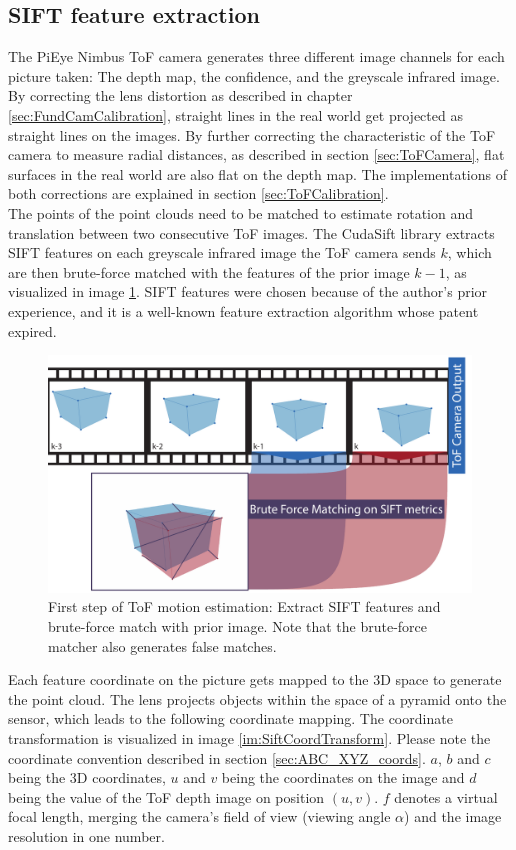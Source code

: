 \subsection{SIFT feature extraction}
\label{sec:ToFPosition_SIFT}
The PiEye Nimbus ToF camera generates three different image channels for each picture taken: The depth map, the confidence, and the greyscale infrared image. By correcting the lens distortion as described in chapter \ref{sec:FundCamCalibration}, straight lines in the real world get projected as straight lines on the images. By further correcting the characteristic of the ToF camera to measure radial distances, as described in section \ref{sec:ToFCamera}, flat surfaces in the real world are also flat on the depth map. The implementations of both corrections are explained in section \ref{sec:ToFCalibration}. \\
The points of the point clouds need to be matched to estimate rotation and translation between two consecutive ToF images. The CudaSift library\cite{cudaSiftRepo}\cite{CudaSiftPublication} extracts SIFT\cite{siftpaper} features on each greyscale infrared image the ToF camera sends $k$, which are then brute-force matched with the features of the prior image $k-1$, as visualized in image \ref{im:SiftExtraction}. SIFT features were chosen because of the author's prior experience, and it is a well-known feature extraction algorithm whose patent expired.\cite{siftpatent}
\begin{figure}[H]
    \centering
    \includegraphics[width=1.0\textwidth]{images/feature_matching_bruteforce.pdf}
    \caption{First step of ToF motion estimation: Extract SIFT features and brute-force match with prior image. Note that the brute-force matcher also generates false matches.}
    \label{im:SiftExtraction}
\end{figure}
Each feature coordinate on the picture gets mapped to the 3D space to generate the point cloud. The lens projects objects within the space of a pyramid onto the sensor, which leads to the following coordinate mapping. The coordinate transformation is visualized in image \ref{im:SiftCoordTransform}. Please note the coordinate convention described in section \ref{sec:ABC_XYZ_coords}. $a$, $b$ and $c$ being the 3D coordinates, $u$ and $v$ being the coordinates on the image and $d$ being the value of the ToF depth image on position $(u,v)$. $f$ denotes a virtual focal length, merging the camera's field of view (viewing angle $\alpha$) and the image resolution in one number.
